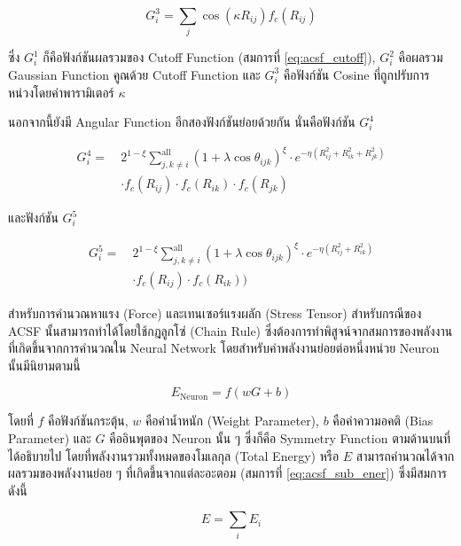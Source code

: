 \begin{equation}\label{eq:rf_g3}
    G^{3}_{i} = \sum_{j} \cos(\kappa R_{ij}) f_{c}(R_{ij})
\end{equation}

\noindent ซึ่ง $G^{1}_{i}$ ก็คือฟังก์ชันผลรวมของ Cutoff Function (สมการที่ \ref{eq:acsf_cutoff}), $G^{2}_{i}$ คือผลรวม 
Gaussian Function คูณด้วย Cutoff Function และ $G^{3}_{i}$ คือฟังก์ชัน Cosine ที่ถูกปรับการหน่วงโดยค่าพารามิเตอร์ $\kappa$ 

นอกจากนี้ยังมี Angular Function อีกสองฟังก์ชันย่อยด้วยกัน นั่นคือฟังก์ชัน $G^{4}_{i}$

\begin{align}\label{eq:rf_g4}
    G^{4}_{i} =~&2^{1 - \xi}\sum^{\text{all}}_{j,k \neq i} (1+\lambda \cos \theta_{ijk})^{\xi}
    \cdot e^{-\eta(R^{2}_{ij} + R^{2}_{ik} + R^{2}_{jk})} \nonumber \\
    & \cdot f_{c}(R_{ij}) \cdot f_{c}(R_{ik}) \cdot f_{c}(R_{jk})
\end{align}

\noindent และฟังก์ชัน $G^{5}_{i}$

\begin{align}\label{eq:rf_g5}
    G^{5}_{i} =~&2^{1 - \xi}\sum^{\text{all}}_{j,k \neq i} (1+\lambda \cos \theta_{ijk})^{\xi}
    \cdot e^{-\eta(R^{2}_{ij} + R^{2}_{ik})} \nonumber \\
    & \cdot f_{c}(R_{ij}) \cdot f_{c}(R_{ik}))
\end{align}

สำหรับการคำนวณหาแรง (Force) และเทนเซอร์แรงผลัก (Stress Tensor) สำหรับกรณีของ ACSF นั้นสามารถทำได้โดยใช้กฎลูกโซ่ (Chain 
Rule) ซึ่งต้องการทำพิสูจน์จากสมการของพลังงานที่เกิดขึ้นจากการคำนวณใน Neural Network โดยสำหรับค่าพลังงานย่อยต่อหนึ่งหน่วย Neuron 
นั้นมีนิยามตามนี้

\begin{equation}\label{eq:acsf_sub_ener}
    E_{\text{Neuron}} = f(w G + b) 
\end{equation}

\noindent โดยที่ $f$ คือฟังก์ชันกระตุ้น, $w$ คือค่าน้ำหนัก (Weight Parameter), $b$ คือค่าความอคติ (Bias Parameter) และ $G$ 
คืออินพุตของ Neuron นั้น ๆ ซึ่งก็คือ Symmetry Function ตามด้านบนที่ได้อธิบายไป โดยที่พลังงานรวมทั้งหมดของโมเลกุล (Total Energy) 
หรือ $E$ สามารถคำนวณได้จากผลรวมของพลังงานย่อย ๆ ที่เกิดขึ้นจากแต่ละอะตอม (สมการที่ \ref{eq:acsf_sub_ener}) ซึ่งมีสมการดังนี้

\begin{equation}
    E = \sum_{i} E_{i}
\end{equation}

